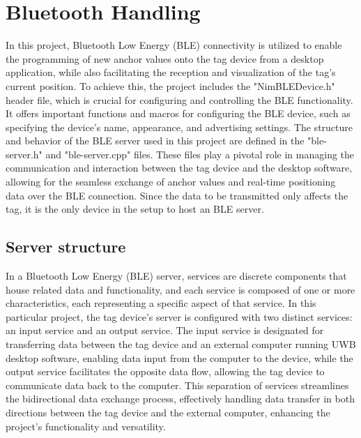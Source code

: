 \chapter{Bluetooth Handling}
\label{chap:Bluetooth_Handling}
In this project, Bluetooth Low Energy (BLE) connectivity is utilized to enable the programming of new anchor values onto the tag device from a desktop application, while also facilitating the reception and visualization of the tag's current position. To achieve this, the project includes the "NimBLEDevice.h" header file, which is crucial for configuring and controlling the BLE functionality. It offers important functions and macros for configuring the BLE device, such as specifying the device's name, appearance, and advertising settings.
\vspace{4pt}
\newline
The structure and behavior of the BLE server used in this project are defined in the "ble-server.h" and "ble-server.cpp" files. These files play a pivotal role in managing the communication and interaction between the tag device and the desktop software, allowing for the seamless exchange of anchor values and real-time positioning data over the BLE connection. 
\vspace{4pt}
\newline
Since the data to be transmitted only affects the tag, it is the only device in the setup to host an BLE server. 

\section{Server structure}
\label{sec:Server_Structure}
In a Bluetooth Low Energy (BLE) server, services are discrete components that house related data and functionality, and each service is composed of one or more characteristics, each representing a specific aspect of that service. In this particular project, the tag device's server is configured with two distinct services: an input service and an output service.
\vspace{4pt}
\newline
The input service is designated for transferring data between the tag device and an external computer running UWB desktop software, enabling data input from the computer to the device, while the output service facilitates the opposite data flow, allowing the tag device to communicate data back to the computer. This separation of services streamlines the bidirectional data exchange process, effectively handling data transfer in both directions between the tag device and the external computer, enhancing the project's functionality and versatility.

